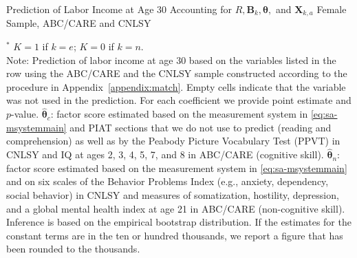 \begin{table}
\begin{threeparttable}
\caption{Prediction of Labor Income at Age 30 Accounting for $R, \bm{B}_k, \bm{\theta},$ and $\bm{X}_{k,a}$ Female Sample, ABC/CARE and CNLSY}
\label{table:inv0}
\centering
\scriptsize

\begin{tablenotes}
\footnotesize
\item $^\ast$ $K=1$ if $k=e$; $K=0$ if $k=n$.\\
Note: Prediction of labor income at age 30 based on the variables listed in the row using the ABC/CARE and the CNLSY sample constructed according to the procedure in Appendix~\ref{appendix:match}. Empty cells indicate that the variable was not used in the prediction. For each coefficient we provide point estimate and $p$-value. $\hat{\bm{\theta}}_{c}$: factor score estimated based on the measurement system in \eqref{eq:sa-msystemmain} and PIAT sections that we do not use to predict (reading and comprehension) as well as by the Peabody Picture Vocabulary Test (PPVT) in CNLSY and IQ at ages 2, 3, 4, 5, 7, and 8 in ABC/CARE (cognitive skill). $\hat{\bm{\theta}}_{n}$: factor score estimated based on the measurement system in \eqref{eq:sa-msystemmain} and on six scales of the Behavior Problems Index (e.g., anxiety, dependency, social behavior) in CNLSY and measures of somatization, hostility, depression, and a global mental health index at age 21 in ABC/CARE (non-cognitive skill). Inference is based on the empirical bootstrap distribution. If the estimates for the constant terms are in the ten or hundred thousands, we report a figure that has been rounded to the thousands.
\end{tablenotes}
\end{threeparttable}
\end{table}


